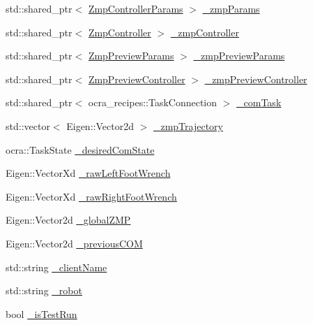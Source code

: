 \begin{DoxyCompactItemize}
\item 
std\+::shared\+\_\+ptr$<$ \hyperlink{structZmpControllerParams}{Zmp\+Controller\+Params} $>$ \hyperlink{classWalkingClient_a20012b4bee7f6de8177ed53907f894cb}{\+\_\+zmp\+Params}
\item 
std\+::shared\+\_\+ptr$<$ \hyperlink{classZmpController}{Zmp\+Controller} $>$ \hyperlink{classWalkingClient_afc6a0ac97a4c3f83e27879e803fab8f6}{\+\_\+zmp\+Controller}
\item 
std\+::shared\+\_\+ptr$<$ \hyperlink{structZmpPreviewParams}{Zmp\+Preview\+Params} $>$ \hyperlink{classWalkingClient_a9a2cf2d6107ab91fc5bd1d82a3b85a84}{\+\_\+zmp\+Preview\+Params}
\item 
std\+::shared\+\_\+ptr$<$ \hyperlink{classZmpPreviewController}{Zmp\+Preview\+Controller} $>$ \hyperlink{classWalkingClient_ae570aa07bed9e336eda93f331f3485fb}{\+\_\+zmp\+Preview\+Controller}
\item 
std\+::shared\+\_\+ptr$<$ ocra\+\_\+recipes\+::\+Task\+Connection $>$ \hyperlink{classWalkingClient_aa798d6193535e80816f8107ee5fb2172}{\+\_\+com\+Task}
\item 
std\+::vector$<$ Eigen\+::\+Vector2d $>$ \hyperlink{classWalkingClient_a8b8a3d7fe6e12d49a0e72d05f9938564}{\+\_\+zmp\+Trajectory}
\item 
ocra\+::\+Task\+State \hyperlink{classWalkingClient_a2625bf687aa3141f5a2404c8d9b3c392}{\+\_\+desired\+Com\+State}
\item 
Eigen\+::\+Vector\+Xd \hyperlink{classWalkingClient_a1c3fb4d182e33d6d9386e9bb05aa4ae8}{\+\_\+raw\+Left\+Foot\+Wrench}
\item 
Eigen\+::\+Vector\+Xd \hyperlink{classWalkingClient_a9df32e0c73632c5f869e5933e20def71}{\+\_\+raw\+Right\+Foot\+Wrench}
\item 
Eigen\+::\+Vector2d \hyperlink{classWalkingClient_aa784eac1247f0d858e2364e0c2bc25b2}{\+\_\+global\+Z\+MP}
\item 
Eigen\+::\+Vector2d \hyperlink{classWalkingClient_a549751e511e023d5fc73eccd1c185317}{\+\_\+previous\+C\+OM}
\item 
std\+::string \hyperlink{classWalkingClient_aff02b341d5e1f500dc9a849337319a8d}{\+\_\+client\+Name}
\item 
std\+::string \hyperlink{classWalkingClient_a67461634d7e8cb0234400b34fd2865e7}{\+\_\+robot}
\item 
bool \hyperlink{classWalkingClient_a4f9c8688537ddd8a487a212fbb279a9b}{\+\_\+is\+Test\+Run}
\item 

\end{DoxyCompactItemize}
